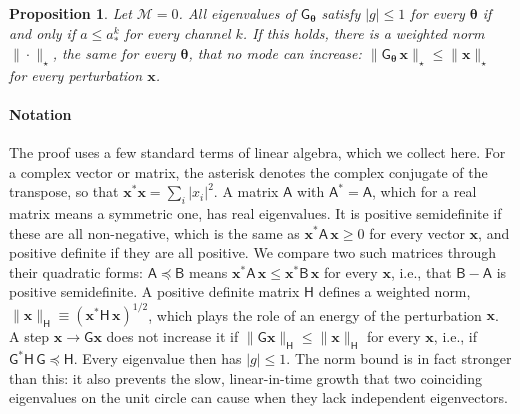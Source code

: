 \documentclass[preprint,12pt,authoryear]{elsarticle}
\newcommand{\tenG}{\mathsf{G}}
\newtheorem{prop}{Proposition}
\newcommand{\calM}{\mathcal{M}}
\begin{document}
\begin{appendix}
\begin{prop}
\label{prop:checkerboard}
Let $\calM = 0$. All eigenvalues of $\tenG_{\boldsymbol{\theta}}$ satisfy $|g| \leq 1$ for every $\boldsymbol{\theta}$ if and only if $a \leq a_*^k$ for every channel $k$. If this holds, there is a weighted norm $\|\cdot\|_\star$, the same for every $\boldsymbol{\theta}$, that no mode can increase: $\|\tenG_{\boldsymbol{\theta}}\,\mathbf{x}\|_\star \leq \|\mathbf{x}\|_\star$ for every perturbation $\mathbf{x}$.
\end{prop}

\paragraph{Notation} The proof uses a few standard terms of linear algebra, which we collect here. For a complex vector or matrix, the asterisk denotes the complex conjugate of the transpose, so that $\mathbf{x}^*\mathbf{x} = \sum_i |x_i|^2$. A matrix $\mathsf{A}$ with $\mathsf{A}^* = \mathsf{A}$, which for a real matrix means a symmetric one, has real eigenvalues. It is positive semidefinite if these are all non-negative, which is the same as $\mathbf{x}^*\mathsf{A}\,\mathbf{x} \geq 0$ for every vector $\mathbf{x}$, and positive definite if they are all positive. We compare two such matrices through their quadratic forms: $\mathsf{A} \preceq \mathsf{B}$ means $\mathbf{x}^*\mathsf{A}\,\mathbf{x} \leq \mathbf{x}^*\mathsf{B}\,\mathbf{x}$ for every $\mathbf{x}$, i.e., that $\mathsf{B} - \mathsf{A}$ is positive semidefinite. A positive definite matrix $\mathsf{H}$ defines a weighted norm, $\|\mathbf{x}\|_{\mathsf{H}} \equiv (\mathbf{x}^*\mathsf{H}\,\mathbf{x})^{1/2}$, which plays the role of an energy of the perturbation $\mathbf{x}$. A step $\mathbf{x} \to \tenG\mathbf{x}$ does not increase it if $\|\tenG\mathbf{x}\|_{\mathsf{H}} \leq \|\mathbf{x}\|_{\mathsf{H}}$ for every $\mathbf{x}$, i.e., if $\tenG^*\mathsf{H}\,\tenG \preceq \mathsf{H}$. Every eigenvalue then has $|g| \leq 1$. The norm bound is in fact stronger than this: it also prevents the slow, linear-in-time growth that two coinciding eigenvalues on the unit circle can cause when they lack independent eigenvectors.


\end{appendix}
\end{document}
